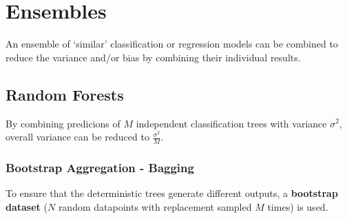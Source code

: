 \section{Ensembles}
An ensemble of `similar' classification or regression models can be combined to reduce the variance and/or bias by combining their individual results.

\subsection{Random Forests}
By combining predicions of $M$ independent classification trees with variance $\sigma^2$, overall variance can be reduced to $\frac{\sigma^2}{M}$.

\subsubsection{Bootstrap Aggregation - Bagging}
To ensure that the deterministic trees generate different outputs, a \textbf{bootstrap dataset} ($N$ random datapoints with replacement sampled $M$ times) is used.

